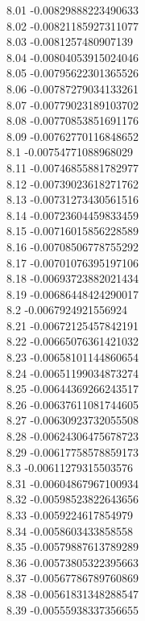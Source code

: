 {8.01	-0.00829888223490633\\
8.02	-0.00821185927311077\\
8.03	-0.0081257480907139\\
8.04	-0.00804053915024046\\
8.05	-0.00795622301365526\\
8.06	-0.00787279034133261\\
8.07	-0.00779023189103702\\
8.08	-0.00770853851691176\\
8.09	-0.00762770116848652\\
8.1	-0.00754771088968029\\
8.11	-0.00746855881782977\\
8.12	-0.00739023618271762\\
8.13	-0.00731273430561516\\
8.14	-0.00723604459833459\\
8.15	-0.00716015856228589\\
8.16	-0.00708506778755292\\
8.17	-0.00701076395197106\\
8.18	-0.00693723882021434\\
8.19	-0.00686448424290017\\
8.2	-0.0067924921556924\\
8.21	-0.00672125457842191\\
8.22	-0.00665076361421032\\
8.23	-0.00658101144860654\\
8.24	-0.00651199034873274\\
8.25	-0.00644369266243517\\
8.26	-0.00637611081744605\\
8.27	-0.00630923732055508\\
8.28	-0.00624306475678723\\
8.29	-0.00617758578859173\\
8.3	-0.00611279315503576\\
8.31	-0.00604867967100934\\
8.32	-0.00598523822643656\\
8.33	-0.0059224617854979\\
8.34	-0.0058603433858558\\
8.35	-0.00579887613789289\\
8.36	-0.00573805322395663\\
8.37	-0.00567786789760869\\
8.38	-0.00561831348288547\\
8.39	-0.00555938337356655\\
}
